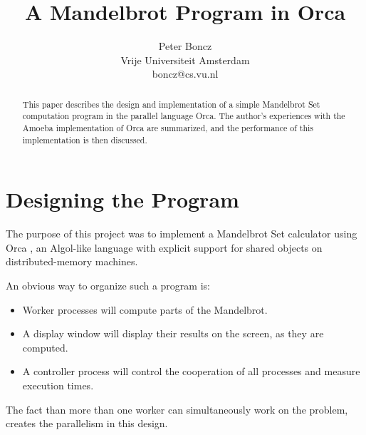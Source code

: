 
\def\Skip{\par\bigskip\nobreak}
\def\sect#1{\section{#1}\small}
\def\subsect#1{\subsection{#1}\small}
\def\subsubsect#1{\subsubsection{#1}\small}

\def\drawpsfig#1#2{
  \begin{figure}[hbt]
    \mbox{\epsffile{#1}}\\
    {\scriptsize \caption{#2}}
  \end{figure}
}

\title{A Mandelbrot Program in Orca}


\author{Peter Boncz \\
	Vrije Universiteit Amsterdam \\
	boncz@cs.vu.nl}



\maketitle

\begin{abstract}
This paper describes the design and implementation of a simple Mandelbrot Set
computation program in the parallel language Orca.
The author's experiences with the Amoeba implementation of Orca are 
summarized, and the performance of this implementation is then discussed.
\end{abstract}
\newpage

\sect{Designing the Program}
The purpose of this project was to implement a Mandelbrot Set calculator
using Orca \cite{orca-refman}, an Algol-like language with explicit support 
for shared objects on distributed-memory machines.

An obvious way to organize such a program is:
\begin{itemize}
\item Worker processes will compute parts of the Mandelbrot.
\item A display window will display their results on the screen,
as they are computed. 
\item A controller process will control the cooperation of all processes and
measure execution times.
\end{itemize}
The fact than more than one worker can simultaneously work on the problem, 
creates the parallelism in this design.

